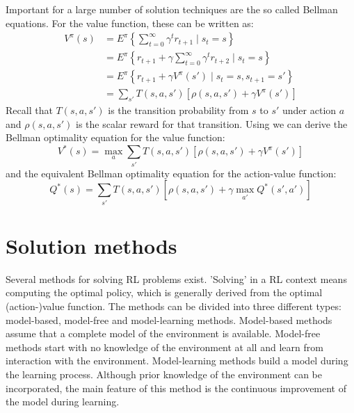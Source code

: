 Important for a large number of solution techniques are the so called Bellman equations. For the value function, these can be written as:
$$%
	\begin{aligned}
		V^\pi(s) &= E^\pi \left\{ \sum_{t=0}^{\infty}\gamma^t r_{t+1} \mid s_t=s \right\} \\
		& = E^\pi \left\{ r_{t+1} + \gamma\sum_{t=0}^{\infty}\gamma^t r_{t+2} \mid s_t = s \right\} \\
		& = E^\pi \left\{ r_{t+1} + \gamma V^\pi(s') \mid s_t = s, s_{t+1} = s' \right\} \\
		& = \sum_{s'} T(s,a,s') \left[ \rho(s,a,s') +\gamma V^\pi(s') \right]
	\end{aligned}
$$%
Recall that $T(s,a,s')$ is the transition probability from $s$ to $s'$ under action $a$ and $\rho(s,a,s')$ is the scalar reward for that transition. Using  we can derive the Bellman optimality equation for the value function:
\begin{equation}\label{eqn:RL-bellmanOptimalityEquationStateValues}
	V^*(s) = \max_{a} \sum_{s'} T(s,a,s') \left[ \rho(s,a,s') +\gamma V^\pi(s') \right]
\end{equation}
and the equivalent Bellman optimality equation for the action-value function:
\begin{equation}\label{eqn:RL-bellmanOptimalityEquationActionStateValues}
	Q^*(s) = \sum_{s'} T(s,a,s') \left[ \rho(s,a,s') +\gamma \max_{a'}Q^*(s',a') \right]
\end{equation}


\section{Solution methods}\label{sec:RL-Solution_methods}
Several methods for solving \ac{RL} problems exist. 'Solving' in a RL context means computing the optimal policy, which is generally derived from the optimal (action-)value function. The methods can be divided into three different types: model-based, model-free and model-learning methods. Model-based methods assume that a complete model of the environment is available. Model-free methods start with no knowledge of the environment at all and learn from interaction with the environment. Model-learning methods build a model during the learning process. Although prior knowledge of the environment can be incorporated, the main feature of this method is the continuous improvement of the model during learning.

